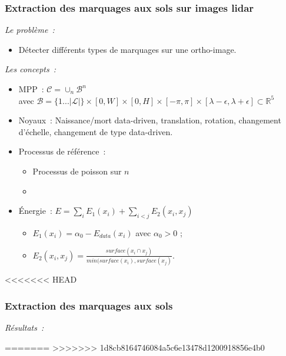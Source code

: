 \documentclass{beamer}
\begin{document}
\begin{frame}
\frametitle{Extraction des marquages aux sols sur images lidar}
\emph{Le probl\`eme~:} 
\begin{itemize}
\item Détecter différents types de marquages sur une ortho-image.
\end{itemize}
\emph{Les concepts~:}
\begin{itemize}
\item MPP~:  $\mathcal{C} = \cup_{n}\mathcal{B}^n$\\
avec $\mathcal{B}=\{1...\vert \mathcal{L}\vert\}\times [0,W]\times[0,H]\times[-\pi,\pi]\times[\lambda-\epsilon,\lambda + \epsilon] \subset  \mathds{R}^{5}$
\item Noyaux~: {\color{red}Naissance/mort data-driven}, translation, rotation, changement d'échelle, {\color{red}changement de type data-driven}. 
\item Processus de référence~:
\begin{itemize}
\item Processus de poisson sur $n$
\item {}
\end{itemize}
\item \'Energie~: $E = \sum_i E_1(x_i) + \sum_{i<j} E_2(x_i,x_j)$
\begin{itemize}
\item $E_1(x_i)=\alpha_{0} - E_{data}(x_i)$ avec $\alpha_{0}>0$ ;
\item $E_2(x_i,x_j) = \frac{surface(x_i \cap x_j)}{min(surface(x_i),surface(x_j)}$.
\end{itemize}
\end{itemize}
\end{frame}
%
<<<<<<< HEAD
\begin{frame}
\frametitle{Extraction des marquages aux sols}
\emph{R\'esultats~:}
\begin{center}
\begin{figure}[ht]
\end{figure}
\end{center}
\end{frame}

=======
>>>>>>> 1d8cb8164746084a5c6e13478d1200918856e4b0
\end{document}
